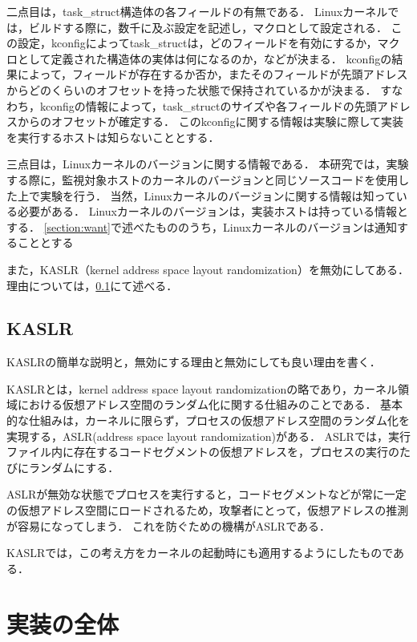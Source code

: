 二点目は，task\_struct構造体の各フィールドの有無である．
Linuxカーネルでは，ビルドする際に，数千に及ぶ設定を記述し，マクロとして設定される．
この設定，kconfigによってtask\_structは，どのフィールドを有効にするか，マクロとして定義された構造体の実体は何になるのか，などが決まる．
kconfigの結果によって，フィールドが存在するか否か，またそのフィールドが先頭アドレスからどのくらいのオフセットを持った状態で保持されているかが決まる．
すなわち，kconfigの情報によって，task\_structのサイズや各フィールドの先頭アドレスからのオフセットが確定する．
このkconfigに関する情報は実験に際して実装を実行するホストは知らないこととする．

三点目は，Linuxカーネルのバージョンに関する情報である．
本研究では，実験する際に，監視対象ホストのカーネルのバージョンと同じソースコードを使用した上で実験を行う．
当然，Linuxカーネルのバージョンに関する情報は知っている必要がある．
Linuxカーネルのバージョンは，実装ホストは持っている情報とする．
\ref{section:want}で述べたもののうち，Linuxカーネルのバージョンは通知することとする

また，KASLR（kernel address space layout randomization）を無効にしてある．理由については，\ref{subsection:kaslr}にて述べる．

\subsection{KASLR}
\label{subsection:kaslr}

KASLRの簡単な説明と，無効にする理由と無効にしても良い理由を書く．

KASLRとは，kernel address space layout randomizationの略であり，カーネル領域における仮想アドレス空間のランダム化に関する仕組みのことである．
基本的な仕組みは，カーネルに限らず，プロセスの仮想アドレス空間のランダム化を実現する，ASLR(address space layout randomization)がある．
ASLRでは，実行ファイル内に存在するコードセグメントの仮想アドレスを，プロセスの実行のたびにランダムにする．

ASLRが無効な状態でプロセスを実行すると，コードセグメントなどが常に一定の仮想アドレス空間にロードされるため，攻撃者にとって，仮想アドレスの推測が容易になってしまう．
これを防ぐための機構がASLRである．

KASLRでは，この考え方をカーネルの起動時にも適用するようにしたものである．



\section{実装の全体}

